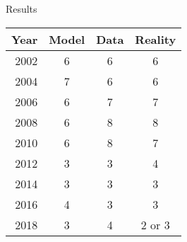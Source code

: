 \documentclass[final]{beamer}
\newlength{\sepwid}
\newlength{\colwidside}
\newlength{\colwidmiddle}
\begin{document}
\begin{frame}[t]
\begin{columns}[t]
\begin{column}{\sepwid}\end{column}







\begin{column}{\colwidside}
\begin{block}{Results}


\hspace{8in} 
\begin{tabular}{r|c|c|c}
  Year & Model & Data & Reality \\
  \hline
  2002  & 6 & 6 & 6 \\
  2004  & 7 & 6 & 6 \\
  2006  & 6 & 7 & 7 \\
  2008  & 6 & 8 & 8 \\
  2010  & 6 & 8 & 7 \\
  2012  & 3 & 3 & 4 \\
  2014  & 3 & 3 & 3 \\
  2016  & 4 & 3 & 3 \\
  2018  & 3 & 4 & 2 or 3 \\
\end{tabular}


\end{block}
\end{column}
\end{columns}
\end{frame}
\end{document}
